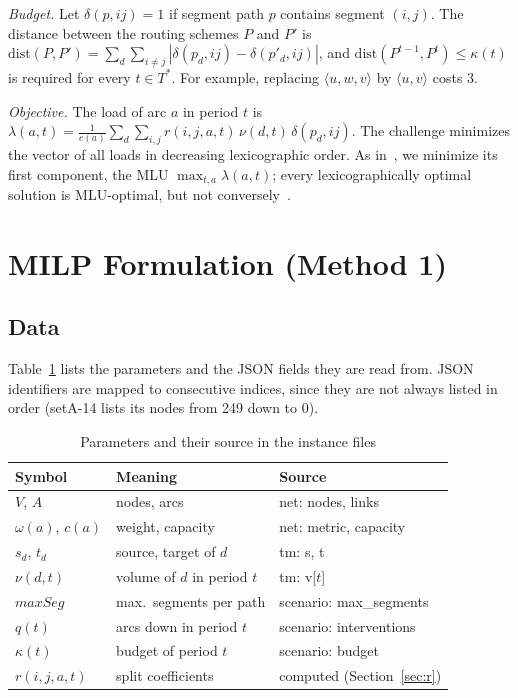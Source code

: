 \documentclass[conference]{IEEEtran}
\begin{document}
\emph{Budget.} Let $\delta(p,ij)=1$ if segment path $p$ contains segment $(i,j)$. The distance between the routing schemes $P$ and $P'$ is $\mathrm{dist}(P,P')=\sum_d\sum_{i\neq j}|\delta(p_d,ij)-\delta(p'_d,ij)|$, and $\mathrm{dist}(P^{t-1},P^t)\le\kappa(t)$ is required for every $t\in T^*$. For example, replacing $\langle u,w,v\rangle$ by $\langle u,v\rangle$ costs 3.

\emph{Objective.} The load of arc $a$ in period $t$ is $\lambda(a,t)=\frac{1}{c(a)}\sum_d\sum_{i,j} r(i,j,a,t)\,\nu(d,t)\,\delta(p_d,ij)$. The challenge minimizes the vector of all loads in decreasing lexicographic order. As in~\cite{jaumard2026}, we minimize its first component, the MLU $\max_{t,a}\lambda(a,t)$; every lexicographically optimal solution is MLU-optimal, but not conversely~\cite{benhamiche2026}.

\section{MILP Formulation (Method 1)}\label{sec:milp}

\subsection{Data}
Table~\ref{tab:data} lists the parameters and the JSON fields they are read from. JSON identifiers are mapped to consecutive indices, since they are not always listed in order (setA-14 lists its nodes from 249 down to 0).

\begin{table}[t]
\centering\footnotesize
\caption{Parameters and their source in the instance files}\label{tab:data}
\begin{tabular}{@{}lll@{}}
\toprule
Symbol & Meaning & Source\\
\midrule
$V$, $A$ & nodes, arcs & net: nodes, links\\
$\omega(a)$, $c(a)$ & weight, capacity & net: metric, capacity\\
$s_d$, $t_d$ & source, target of $d$ & tm: s, t\\
$\nu(d,t)$ & volume of $d$ in period $t$ & tm: v[$t$]\\
$maxSeg$ & max.\ segments per path & scenario: max\_segments\\
$q(t)$ & arcs down in period $t$ & scenario: interventions\\
$\kappa(t)$ & budget of period $t$ & scenario: budget\\
$r(i,j,a,t)$ & split coefficients & computed (Section~\ref{sec:r})\\
\bottomrule
\end{tabular}
\end{table}
\end{document}
